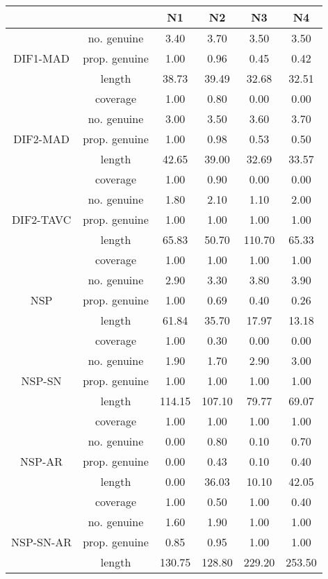 \begin{tabular}{|c|c|c|c|c|c|}
  \hline
 &  & N1 & N2 & N3 & N4 \\ 
  \hline
 & no. genuine & 3.40 & 3.70 & 3.50 & 3.50 \\ 
  DIF1-MAD & prop. genuine & 1.00 & 0.96 & 0.45 & 0.42 \\ 
   & length & 38.73 & 39.49 & 32.68 & 32.51 \\ 
   & coverage & 1.00 & 0.80 & 0.00 & 0.00 \\ 
   & no. genuine & 3.00 & 3.50 & 3.60 & 3.70 \\ 
  DIF2-MAD & prop. genuine & 1.00 & 0.98 & 0.53 & 0.50 \\ 
   & length & 42.65 & 39.00 & 32.69 & 33.57 \\ 
   & coverage & 1.00 & 0.90 & 0.00 & 0.00 \\ 
   & no. genuine & 1.80 & 2.10 & 1.10 & 2.00 \\ 
  DIF2-TAVC & prop. genuine & 1.00 & 1.00 & 1.00 & 1.00 \\ 
   & length & 65.83 & 50.70 & 110.70 & 65.33 \\ 
   & coverage & 1.00 & 1.00 & 1.00 & 1.00 \\ 
   & no. genuine & 2.90 & 3.30 & 3.80 & 3.90 \\ 
  NSP & prop. genuine & 1.00 & 0.69 & 0.40 & 0.26 \\ 
   & length & 61.84 & 35.70 & 17.97 & 13.18 \\ 
   & coverage & 1.00 & 0.30 & 0.00 & 0.00 \\ 
   & no. genuine & 1.90 & 1.70 & 2.90 & 3.00 \\ 
  NSP-SN & prop. genuine & 1.00 & 1.00 & 1.00 & 1.00 \\ 
   & length & 114.15 & 107.10 & 79.77 & 69.07 \\ 
   & coverage & 1.00 & 1.00 & 1.00 & 1.00 \\ 
   & no. genuine & 0.00 & 0.80 & 0.10 & 0.70 \\ 
  NSP-AR & prop. genuine & 0.00 & 0.43 & 0.10 & 0.40 \\ 
   & length & 0.00 & 36.03 & 10.10 & 42.05 \\ 
   & coverage & 1.00 & 0.50 & 1.00 & 0.40 \\ 
   & no. genuine & 1.60 & 1.90 & 1.00 & 1.00 \\ 
  NSP-SN-AR & prop. genuine & 0.85 & 0.95 & 1.00 & 1.00 \\ 
   & length & 130.75 & 128.80 & 229.20 & 253.50 \\ 

\end{tabular}
